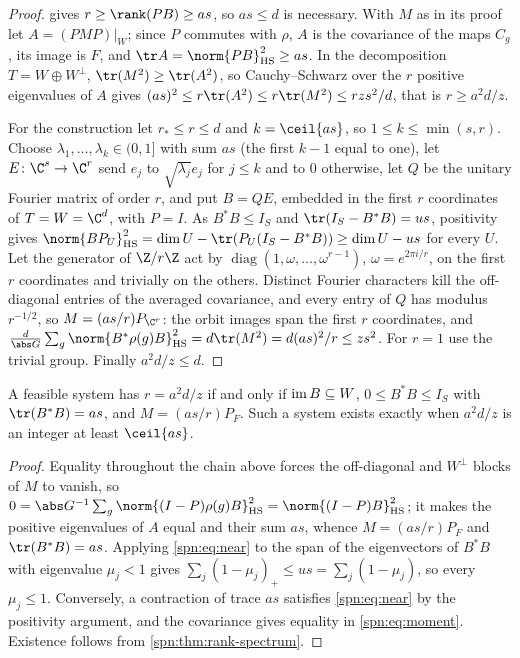 \begin{proof}
 gives $r\ge\rank(PB)\ge as$, so $as\le d$ is necessary. With $M$ as in its proof
let $A=(PMP)|_W$; since $P$ commutes with $\rho$, $A$ is the covariance of the maps $C_g$, its image
is $F$, and $\tr A=\norm{PB}_{\spnHS}^2\ge as$. In the decomposition $T=W\oplus W^\perp$,
$\tr(M^2)\ge\tr(A^2)$, so Cauchy--Schwarz over the $r$ positive eigenvalues of $A$ gives
$(as)^2\le r\tr(A^2)\le r\tr(M^2)\le rzs^2/d$, that is $r\ge a^2d/z$.

For the construction let $r_*\le r\le d$ and $k=\ceil{as}$, so $1\le k\le\min(s,r)$. Choose
$\lambda_1,\dots,\lambda_k\in(0,1]$ with sum $as$ (the first $k-1$ equal to one), let
$E\colon\C^s\to\C^r$ send $e_j$ to $\sqrt{\lambda_j}e_j$ for $j\le k$ and to $0$ otherwise, let $Q$ be
the unitary Fourier matrix of order $r$, and put $B=QE$, embedded in the first $r$ coordinates of
$T=W=\C^d$, with $P=I$. As $B^*B\le I_S$ and $\tr(I_S-B^*B)=us$, positivity gives
$\norm{BP_U}_{\spnHS}^2=\dim U-\tr(P_U(I_S-B^*B))\ge\dim U-us$ for every $U$. Let the generator of
$\Z/r\Z$ act by $\operatorname{diag}(1,\omega,\dots,\omega^{r-1})$, $\omega=e^{2\pi i/r}$, on the first $r$
coordinates and trivially on the others. Distinct Fourier characters kill the off-diagonal entries
of the averaged covariance, and every entry of $Q$ has modulus $r^{-1/2}$, so $M=(as/r)P_{\C^r}$: the
orbit images span the first $r$ coordinates, and
$\frac d{\abs G}\sum_g\norm{B^*\rho(g)B}_{\spnHS}^2=d\tr(M^2)=d(as)^2/r\le zs^2$. For $r=1$ use the
trivial group. Finally $a^2d/z\le d$.
\end{proof}

\begin{proposition}\label{spn:prop:rank-equality}
A feasible system has $r=a^2d/z$ if and only if $\operatorname{im} B\subseteq W$, $0\le B^*B\le I_S$ with
$\tr(B^*B)=as$, and $M=(as/r)P_F$. Such a system exists exactly when $a^2d/z$ is an integer at least
$\ceil{as}$.
\end{proposition}

\begin{proof}
Equality throughout the chain above forces the off-diagonal and $W^\perp$ blocks of $M$ to vanish, so
$0=\abs G^{-1}\sum_g\norm{(I-P)\rho(g)B}_{\spnHS}^2=\norm{(I-P)B}_{\spnHS}^2$; it makes the positive
eigenvalues of $A$ equal and their sum $as$, whence $M=(as/r)P_F$ and $\tr(B^*B)=as$. Applying
\eqref{spn:eq:near} to the span of the eigenvectors of $B^*B$ with eigenvalue $\mu_j<1$ gives
$\sum_j(1-\mu_j)_+\le us=\sum_j(1-\mu_j)$, so every $\mu_j\le1$. Conversely, a contraction of trace
$as$ satisfies \eqref{spn:eq:near} by the positivity argument, and the covariance gives equality in
\eqref{spn:eq:moment}. Existence follows from \cref{spn:thm:rank-spectrum}.
\end{proof}

